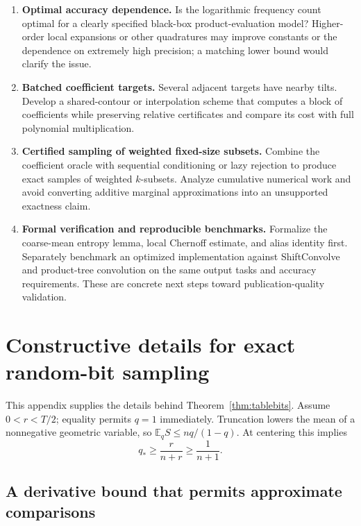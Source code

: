 \documentclass[11pt,a4paper]{article}
\theoremstyle{definition}
\newcommand{\E}{\mathbb E}
\begin{document}
\begin{enumerate}[label=\textbf{Q\arabic*.},leftmargin=3em]
\item \textbf{Optimal accuracy dependence.} Is the logarithmic frequency count optimal for a clearly specified black-box product-evaluation model? Higher-order local expansions or other quadratures may improve constants or the dependence on extremely high precision; a matching lower bound would clarify the issue.

\item \textbf{Batched coefficient targets.} Several adjacent targets have nearby tilts. Develop a shared-contour or interpolation scheme that computes a block of coefficients while preserving relative certificates and compare its cost with full polynomial multiplication.

\item \textbf{Certified sampling of weighted fixed-size subsets.} Combine the coefficient oracle with sequential conditioning or lazy rejection to produce exact samples of weighted $k$-subsets. Analyze cumulative numerical work and avoid converting additive marginal approximations into an unsupported exactness claim.

\item \textbf{Formal verification and reproducible benchmarks.} Formalize the coarse-mean entropy lemma, local Chernoff estimate, and alias identity first. Separately benchmark an optimized implementation against ShiftConvolve and product-tree convolution on the same output tasks and accuracy requirements. These are concrete next steps toward publication-quality validation.
\end{enumerate}

\appendix
\section{Constructive details for exact random-bit sampling}\label{app:bits}

This appendix supplies the details behind Theorem~\ref{thm:tablebits}. Assume $0<r<T/2$; equality permits $q=1$ immediately. Truncation lowers the mean of a nonnegative geometric variable, so
$\E_q S\le nq/(1-q)$. At centering this implies
\begin{equation}\label{eq:qstarminimum}
 q_*\ge\frac{r}{n+r}\ge\frac1{n+1}.
\end{equation}

\subsection{A derivative bound that permits approximate comparisons}
\end{document}
